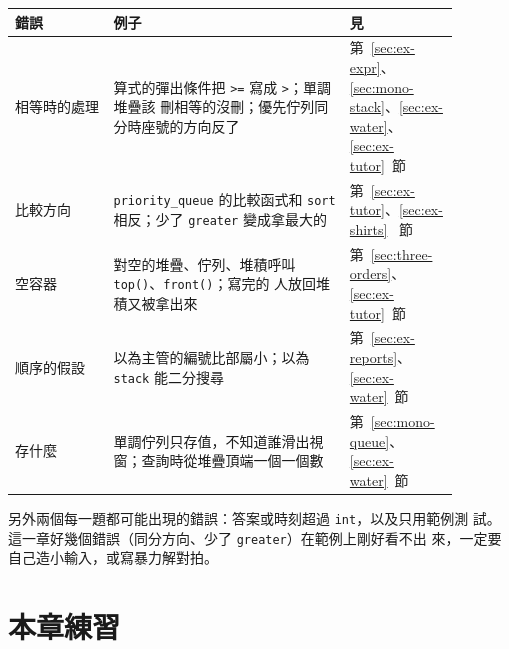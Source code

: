 \begin{center}
\begin{tabular}{p{0.2\linewidth}p{0.48\linewidth}p{0.2\linewidth}}
\toprule
錯誤 & 例子 & 見 \\
\midrule
相等時的處理 & 算式的彈出條件把 \texttt{>=} 寫成 \texttt{>}；單調堆疊該
刪相等的沒刪；優先佇列同分時座號的方向反了 &
第~\ref{sec:ex-expr}、\ref{sec:mono-stack}、\ref{sec:ex-water}、
\ref{sec:ex-tutor}~節 \\
比較方向 & \texttt{priority\_queue} 的比較函式和 \texttt{sort} 相反；少了
\texttt{greater} 變成拿最大的 & 第~\ref{sec:ex-tutor}、\ref{sec:ex-shirts}~
節 \\
空容器 & 對空的堆疊、佇列、堆積呼叫 \texttt{top()}、\texttt{front()}；寫完的
人放回堆積又被拿出來 & 第~\ref{sec:three-orders}、\ref{sec:ex-tutor}~節 \\
順序的假設 & 以為主管的編號比部屬小；以為 \texttt{stack} 能二分搜尋 &
第~\ref{sec:ex-reports}、\ref{sec:ex-water}~節 \\
存什麼 & 單調佇列只存值，不知道誰滑出視窗；查詢時從堆疊頂端一個一個數 &
第~\ref{sec:mono-queue}、\ref{sec:ex-water}~節 \\
\bottomrule
\end{tabular}
\end{center}

另外兩個每一題都可能出現的錯誤：答案或時刻超過 \texttt{int}，以及只用範例測
試。 這一章好幾個錯誤（同分方向、少了 \texttt{greater}）在範例上剛好看不出
來，一定要自己造小輸入，或寫暴力解對拍。

\section{本章練習}
\label{sec:ch6-exercises}

